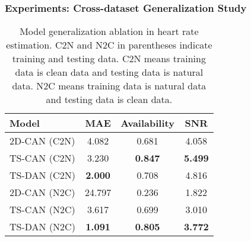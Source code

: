 \documentclass[aspectratio=169, table]{beamer}
\begin{document}
\begin{frame}
\frametitle{\textbf{Experiments: Cross-dataset Generalization Study}}
 
\begin{table}[h]
\caption{Model generalization ablation in heart rate estimation. C2N and N2C in parentheses indicate training and testing data. C2N means training data is clean data and testing data is natural data. N2C means training data is natural data and testing data is clean data.}
\begin{center}
\centering
\begin{tabular}{lccc}\hline
  Model & MAE & Availability & SNR\\ \hline
2D-CAN \cite{chen2018deepphys} (C2N)    &4.082 & 0.681 & 4.058 \\  
TS-CAN \cite{liu2020multi}(C2N)    &3.230 & \textbf{0.847} & \textbf{5.499}\\  
TS-DAN (C2N)    &\textbf{2.000} & 0.708& 4.816\\ \hline
2D-CAN \cite{chen2018deepphys} (N2C)    &24.797 & 0.236 & 1.822 \\ 
TS-CAN \cite{liu2020multi}(N2C)    &3.617 & 0.699& 3.010 \\ 
TS-DAN (N2C)    &\textbf{1.091} & \textbf{0.805}& \textbf{3.772}\\ \hline
\end{tabular}
\end{center}
\label{generalization}
\end{table}

\end{frame}
\end{document}
